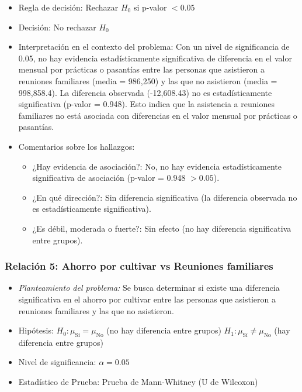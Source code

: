 \documentclass[12pt,a4paper]{article}
\begin{document}
\begin{itemize}
    \item Regla de decisión: Rechazar $H_0$ si p-valor $< 0.05$
    \item Decisión: No rechazar $H_0$
    \item Interpretación en el contexto del problema: Con un nivel de significancia de 0.05, no hay evidencia estadísticamente significativa de diferencia en el valor mensual por prácticas o pasantías entre las personas que asistieron a reuniones familiares (media = 986,250) y las que no asistieron (media = 998,858.4). La diferencia observada (-12,608.43) no es estadísticamente significativa (p-valor = 0.948). Esto indica que la asistencia a reuniones familiares no está asociada con diferencias en el valor mensual por prácticas o pasantías.
    \item Comentarios sobre los hallazgos:
    \begin{itemize}
        \item ¿Hay evidencia de asociación?: No, no hay evidencia estadísticamente significativa de asociación (p-valor = 0.948 $> 0.05$).
        \item ¿En qué dirección?: Sin diferencia significativa (la diferencia observada no es estadísticamente significativa).
        \item ¿Es débil, moderada o fuerte?: Sin efecto (no hay diferencia significativa entre grupos).
    \end{itemize}
\end{itemize}

\subsubsection*{Relación 5: Ahorro por cultivar vs Reuniones familiares}

\begin{itemize}
    \item \textit{Planteamiento del problema:} Se busca determinar si existe una diferencia significativa en el ahorro por cultivar entre las personas que asistieron a reuniones familiares y las que no asistieron.
    \item Hipótesis: \quad $H_0: \mu_{\text{Sí}} = \mu_{\text{No}}$ (no hay diferencia entre grupos) \hspace{1cm} $H_1: \mu_{\text{Sí}} \neq \mu_{\text{No}}$ (hay diferencia entre grupos)
    \item Nivel de significancia: $\alpha = 0.05$
    \item Estadístico de Prueba: Prueba de Mann-Whitney (U de Wilcoxon)
\end{itemize}
\end{document}
